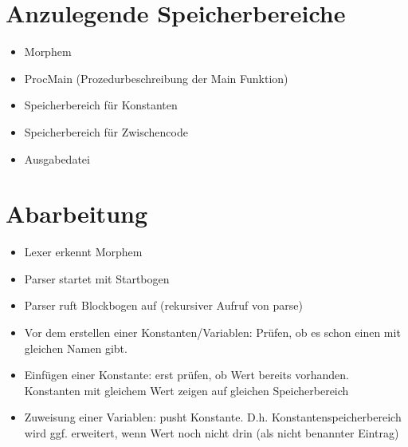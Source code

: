 
\section{Anzulegende Speicherbereiche}
\begin{itemize}
\item Morphem
\item ProcMain (Prozedurbeschreibung der Main Funktion)
\item Speicherbereich für Konstanten
\item Speicherbereich für Zwischencode
\item Ausgabedatei
\end{itemize}

\section{Abarbeitung}
\begin{itemize}
\item Lexer erkennt Morphem
\item Parser startet mit Startbogen
\item Parser ruft Blockbogen auf (rekursiver Aufruf von parse)
\item Vor dem erstellen einer Konstanten/Variablen: Prüfen, ob es schon einen mit gleichen Namen gibt.
\item Einfügen einer Konstante: erst prüfen, ob Wert bereits vorhanden. Konstanten mit gleichem Wert zeigen auf gleichen Speicherbereich
\item Zuweisung einer Variablen: pusht Konstante. D.h. Konstantenspeicherbereich wird ggf. erweitert, wenn Wert noch nicht drin (als nicht benannter Eintrag)
\end{itemize}





